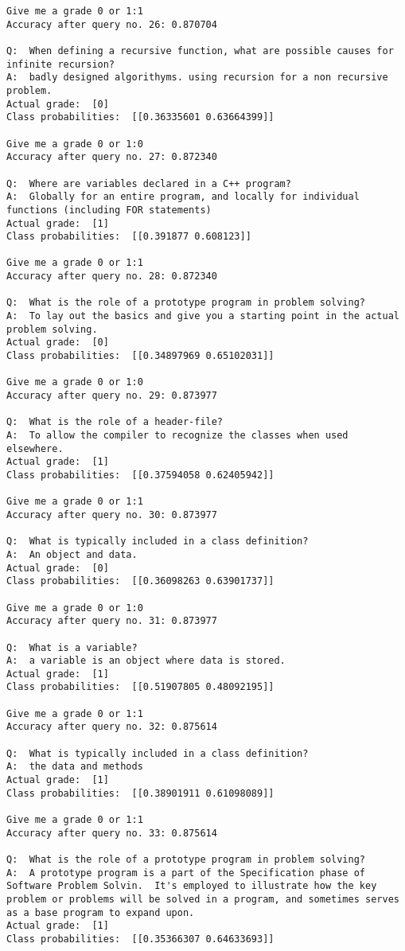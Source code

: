\documentclass[11pt]{article}
\begin{document}
\begin{Verbatim}[commandchars=\\\{\}]
Give me a grade 0 or 1:1
Accuracy after query no. 26: 0.870704

Q:  When defining a recursive function, what are possible causes for infinite recursion?
A:  badly designed algorithyms. using recursion for a non recursive problem.
Actual grade:  [0]
Class probabilities:  [[0.36335601 0.63664399]]

Give me a grade 0 or 1:0
Accuracy after query no. 27: 0.872340

Q:  Where are variables declared in a C++ program?
A:  Globally for an entire program, and locally for individual functions (including FOR statements)
Actual grade:  [1]
Class probabilities:  [[0.391877 0.608123]]

Give me a grade 0 or 1:1
Accuracy after query no. 28: 0.872340

Q:  What is the role of a prototype program in problem solving?
A:  To lay out the basics and give you a starting point in the actual problem solving.
Actual grade:  [0]
Class probabilities:  [[0.34897969 0.65102031]]

Give me a grade 0 or 1:0
Accuracy after query no. 29: 0.873977

Q:  What is the role of a header-file?
A:  To allow the compiler to recognize the classes when used elsewhere.
Actual grade:  [1]
Class probabilities:  [[0.37594058 0.62405942]]

Give me a grade 0 or 1:1
Accuracy after query no. 30: 0.873977

Q:  What is typically included in a class definition?
A:  An object and data.
Actual grade:  [0]
Class probabilities:  [[0.36098263 0.63901737]]

Give me a grade 0 or 1:0
Accuracy after query no. 31: 0.873977

Q:  What is a variable?
A:  a variable is an object where data is stored.
Actual grade:  [1]
Class probabilities:  [[0.51907805 0.48092195]]

Give me a grade 0 or 1:1
Accuracy after query no. 32: 0.875614

Q:  What is typically included in a class definition?
A:  the data and methods 
Actual grade:  [1]
Class probabilities:  [[0.38901911 0.61098089]]

Give me a grade 0 or 1:1
Accuracy after query no. 33: 0.875614

Q:  What is the role of a prototype program in problem solving?
A:  A prototype program is a part of the Specification phase of Software Problem Solvin.  It's employed to illustrate how the key problem or problems will be solved in a program, and sometimes serves as a base program to expand upon.
Actual grade:  [1]
Class probabilities:  [[0.35366307 0.64633693]]


\end{Verbatim}
\end{document}

